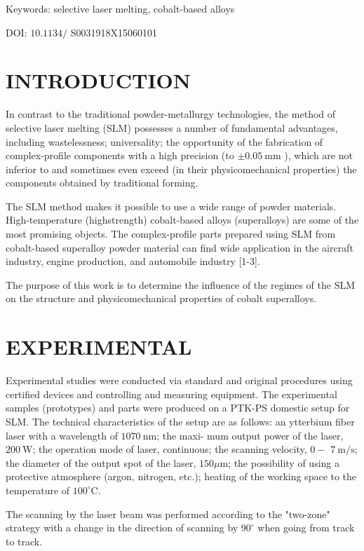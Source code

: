 \documentclass[10pt]{article}
\begin{document}
Keywords: selective laser melting, cobalt-based alloys

DOI: $10.1134 /$ S0031918X15060101

\section*{INTRODUCTION}
In contrast to the traditional powder-metallurgy technologies, the method of selective laser melting (SLM) possesses a number of fundamental advantages, including wastelessness; universality; the opportunity of the fabrication of complex-profile components with a high precision (to $\pm 0.05 \mathrm{~mm}$ ), which are not inferior to and sometimes even exceed (in their physicomechanical properties) the components obtained by traditional forming.

The SLM method makes it possible to use a wide range of powder materials. High-temperature (highstrength) cobalt-based alloys (superalloys) are some of the most promising objects. The complex-profile parts prepared using SLM from cobalt-based superalloy powder material can find wide application in the aircraft industry, engine production, and automobile industry [1-3].

The purpose of this work is to determine the influence of the regimes of the SLM on the structure and physicomechanical properties of cobalt superalloys.

\section*{EXPERIMENTAL}
Experimental studies were conducted via standard and original procedures using certified devices and controlling and measuring equipment. The experimental samples (prototypes) and parts were produced on a PTK-PS domestic setup for SLM. The technical characteristics of the setup are as follows: an ytterbium fiber laser with a wavelength of $1070 \mathrm{~nm}$; the maxi- mum output power of the laser, $200 \mathrm{~W}$; the operation mode of laser, continuous; the scanning velocity, $0-$ $7 \mathrm{~m} / \mathrm{s}$; the diameter of the output spot of the laser, $150 \mu \mathrm{m}$; the possibility of using a protective atmosphere (argon, nitrogen, etc.); heating of the working space to the temperature of $100^{\circ} \mathrm{C}$.

The scanning by the laser beam was performed according to the "two-zone" strategy with a change in the direction of scanning by $90^{\circ}$ when going from track to track.
\end{document}
